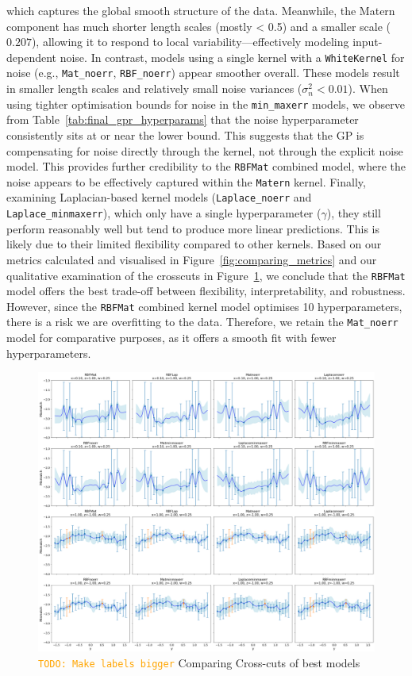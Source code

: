 \documentclass[12pt]{article}
\newcommand{\todo}[1]{\textcolor{orange}{\texttt{TODO: #1}}}
\begin{document}
which captures the global smooth structure of the data. Meanwhile, the Matern component has much shorter length scales (mostly < 0.5) and a smaller scale ($0.207$), allowing it to respond to local variability—effectively modeling input-dependent noise.
In contrast, models using a single kernel with a \texttt{WhiteKernel} for noise (e.g., \texttt{Mat\_noerr}, \texttt{RBF\_noerr}) appear smoother overall. These models result in smaller length scales and relatively small noise variances ($\sigma_n^2 < 0.01$).
When using tighter optimisation bounds for noise in the \texttt{min\_maxerr} models, we observe from Table~\ref{tab:final_gpr_hyperparams} that the noise hyperparameter consistently sits at or near the lower bound. 
This suggests that the GP is compensating for noise directly through the kernel, not through the explicit noise model. This provides further credibility to the \texttt{RBFMat} combined model, where the noise appears to be effectively captured within the \texttt{Matern} kernel.
Finally, examining Laplacian-based kernel models (\texttt{Laplace\_noerr} and \texttt{Laplace\_minmaxerr}), which only have a single hyperparameter ($\gamma$), they still perform reasonably well but tend to produce more linear predictions. This is likely due to their limited flexibility compared to other kernels.
Based on our metrics calculated and visualised in Figure~\ref{fig:comparing_metrics} and our qualitative examination of the crosscuts in Figure~\ref{fig:crosscuts_bestmodels}, we conclude that the \texttt{RBFMat} model offers the best trade-off between flexibility, interpretability, and robustness.
However, since the \texttt{RBFMat} combined kernel model optimises 10 hyperparameters, there is a risk we are overfitting to the data. Therefore, we retain the \texttt{Mat\_noerr} model for comparative purposes, as it offers a smooth fit with fewer hyperparameters.

\begin{figure}[H]
    \centering
    \includegraphics[width=1\textwidth]{LatexPlots/final_gps_plots/gps_crosscuts_bestmodels.png}
    \caption{\todo{Make labels bigger} Comparing Cross-cuts of best models}
    \label{fig:crosscuts_bestmodels}
\end{figure}
\end{document}
